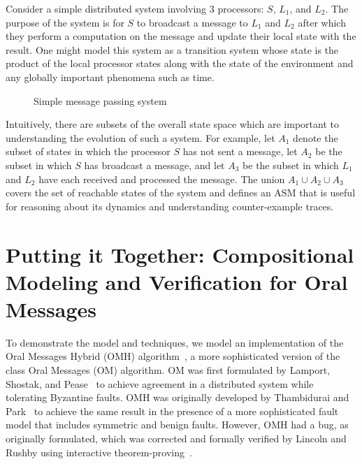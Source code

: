 \documentclass{llncs/llncs}
\begin{document}
\begin{example}
Consider a simple distributed system involving 3 processors: $S$, $L_1$, and $L_2$. The purpose of the system is for $S$ to broadcast a message to $L_1$ and $L_2$ after which they perform a computation on the message and update their local state with the result. One might model this system as a transition system whose state is the product of the local processor states along with the state of the environment and any globally important phenomena such as time.

\begin{figure}
\centering
{}
\label{fig:exa-trans}
\caption{Simple message passing system}
\end{figure}

Intuitively, there are subsets of the overall state space which are important to understanding the evolution of such a system. For example, let $A_1$ denote the subset of states in which the processor $S$ has not sent a message, let $A_2$ be the subset in which $S$ has broadcast a message, and let $A_3$ be the subset in which $L_1$ and $L_2$ have each received and processed the message. The union $A_1 \cup A_2 \cup A_3$ covers the set of reachable states of the system and defines an ASM that is useful for reasoning about its dynamics and understanding counter-example traces.
\end{example}



\section{Putting it Together: Compositional Modeling and Verification for Oral Messages}\label{sec:byz}

To demonstrate the model and techniques, we model an implementation of the Oral Messages Hybrid (OMH) algorithm~\cite{}, a more sophisticated version of the class Oral Messages (OM) algorithm. OM was first formulated by Lamport, Shostak, and Pease~\cite{om} to achieve agreement in a distributed system while tolerating Byzantine faults. OMH was originally developed by Thambidurai and Park~\cite{hybrid} to achieve the same result in the presence of a more sophisticated fault model that includes symmetric and benign faults. However, OMH had a bug, as originally formulated, which was corrected and formally verified by Lincoln and Rushby using interactive theorem-proving~\cite{csl-93-2}.
\end{document}
